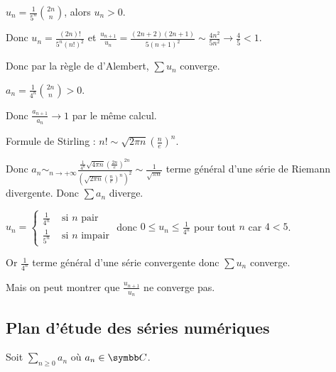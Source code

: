 \begin{exemple}
    $u_n = \frac{1 }{5^n } \binom{2n}{n}$, alors $u_n > 0$. 

    Donc $\displaystyle u_n = \frac{(2n)!}{5^n (n!)^2}$ et $\frac{u_{n + 1}}{u_n} = \frac{(2n + 2)(2n + 1)}{5 (n + 1)^2} \sim \frac{4 n^2}{5 n^2} \longrightarrow \frac 4 5 < 1$.

    Donc par la règle de d'Alembert, $\sum u_n$ converge.

    \lvspace $\displaystyle a_n = \frac{1}{4^n} \binom{2n}{n} > 0$. 

    Donc $\frac{a_{n + 1}}{a_n} \longrightarrow 1$ par le même calcul. 

    Formule de Stirling : $n! \sim \sqrt{2 \pi n} \left( \frac{n}{e} \right)^n$.

    \svspace Donc $\displaystyle a_n \sim_{n \to + \infty} \frac{\frac{1}{4^n} \sqrt{4 \pi n} \left( \frac{2n} e \right)^{2n}}{\left( \sqrt{2 \pi n} \left( \frac{n}{e} \right)^n \right)^2 } \sim \frac 1 {\sqrt{ \pi n}}$
    terme général d'une série de Riemann divergente. 
    Donc $\sum a_n$ diverge.

    \lvspace $u_n = \left\{ \begin{array}{rl}
        \frac{1}{4^n} & \text{ si } n \text{ pair} \\
        \frac{1}{5^n} & \text{ si } n \text{ impair}
    \end{array} \right.$
    donc $0 \leqslant u_n \leqslant \frac 1 {4^n}$ pour tout $n$ car $4 < 5$.

    Or $\frac 1 {4^n}$ terme général d'une série convergente donc $\sum u_n$ converge. 

    Mais on peut montrer que $\frac{u_{n + 1}}{u_n}$ ne converge pas.
\end{exemple}

\subsection{Plan d'étude des séries numériques}

Soit $\displaystyle \sum_{n \ge 0} a_n$ où $a_n \in \C$.

